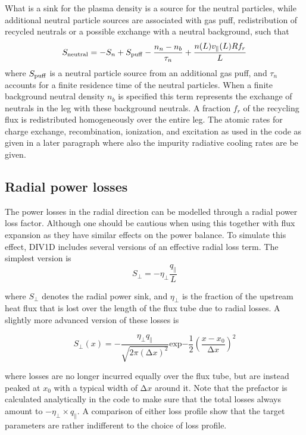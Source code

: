 \documentclass[amsmath,amssymb,a4]{revtex4-2}
\begin{document}
What is a sink for the plasma density is a source for the neutral particles, while additional neutral particle sources are associated with gas puff, redistribution of recycled neutrals or a possible exchange with a neutral background, such that
\begin{equation}\label{neutral_source}
    S_{\rm neutral} = - S_n + S_{\rm puff} - \frac{n_n - n_b}{\tau_n} + {n(L)v_{\|}(L)R f_r \over L}
\end{equation}
where $S_{\rm puff}$ is a neutral particle source from an additional gas puff, and $\tau_n$ accounts for a finite residence time of the neutral particles. When a finite background neutral density $n_b$ is specified this term represents the exchange of neutrals in the leg with these background neutrals. A fraction $f_r$ of the recycling flux is redistributed homogeneously over the entire leg. The atomic rates for charge exchange, recombination, ionization, and excitation as used in the code as given in a later paragraph where also the impurity radiative cooling rates are be given.


\subsection{Radial power losses}
The power losses in the radial direction can be modelled through a radial power loss factor. Although one should be cautious when using this together with flux expansion as  they have similar effects on the power balance.
To simulate this effect, DIV1D includes several versions of an effective radial loss term. The simplest version is
\begin{equation}
\label{constant_rad_losses}
S_{\perp}=-\eta_{\perp}\frac{q_\parallel}{L}
\end{equation}

where $S_{\perp}$ denotes the radial power sink, and $\eta_{\perp}$ is the fraction of the upstream heat flux that is lost over the length of the flux tube due to radial losses. A slightly more advanced version of these losses is

\begin{equation}
S_\perp(x)=-\frac{\eta_{\perp}q_{\parallel}}{\sqrt{2\pi(\mathrm{\Delta}x)^2}}
\mathrm{exp}{-\frac{1}{2}\left(\frac{x-x_0}{\mathrm{\Delta}x}\right)^2}
\end{equation}

where losses are no longer incurred equally over the flux tube, but are instead peaked at $x_0$ with a typical width of $\mathrm{\Delta}x$ around it. Note that the prefactor is calculated analytically in the code to make sure that the total losses always amount to $-\eta_{\perp}\times q_{\parallel}$. A comparison of either loss profile show that the target parameters are rather indifferent to the choice of loss profile.\\
\end{document}
